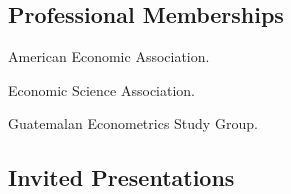 \documentclass{article}%
\renewenvironment{itemize}{
\begin{list}{}{
\setlength{\leftmargin}{1.5em}
}
}{
\end{list}
}
\begin{document}
\subsection*{Professional Memberships}

\begin{itemize}
\item American Economic Association.

\item Economic Science Association.

\item Guatemalan Econometrics Study Group.


\end{itemize}

\subsection*{Invited Presentations}
\end{document}
